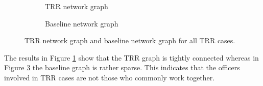 \documentclass[10pt]{article}
\begin{document}
\begin{figure}
\captionsetup{font=small}
    \begin{subfigure}{0.5\textwidth}
        \caption{TRR network graph}
        \label{trr}
    \end{subfigure}%
    \begin{subfigure}{0.5\textwidth}
        \caption{Baseline network graph}
        \label{baseline}
    \end{subfigure}
\caption{TRR network graph and baseline network graph for all TRR cases.}
\end{figure}

The results in Figure \ref{trr} show that the TRR graph is tightly connected whereas in Figure \ref{baseline} the baseline graph is rather sparse. This indicates that the officers involved in TRR cases are not those who commonly work together.
\end{document}
